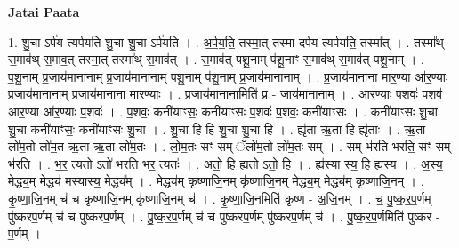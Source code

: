 \documentclass[17pt]{extarticle}
\begin{document}
\textbf{Jatai Paata} \newline

1. शु॒चा ऽर्प॑य त्यर्पयति शु॒चा शु॒चा ऽर्प॑यति । . अ॒र्प॒य॒ति॒ तस्मा॒त् तस्मा॑ दर्पय त्यर्पयति॒ तस्मा᳚त् । . तस्मा᳚थ् स॒माव॑थ् स॒माव॒त् तस्मा॒त् तस्मा᳚थ् स॒माव॑त् । . स॒माव॑त् पशू॒नाम् प॑शू॒नाꣳ स॒माव॑थ् स॒माव॑त् पशू॒नाम् । . प॒शू॒नाम् प्र॒जाय॑मानानाम् प्र॒जाय॑मानानाम् पशू॒नाम् प॑शू॒नाम् प्र॒जाय॑मानानाम् । . प्र॒जाय॑मानाना मार॒ण्या आ॑र॒ण्याः प्र॒जाय॑मानानाम् प्र॒जाय॑मानाना मार॒ण्याः । . प्र॒जाय॑मानाना॒मिति॑ प्र - जाय॑मानानाम् । . आ॒र॒ण्याः प॒शवः॑ प॒शव॑ आर॒ण्या आ॑र॒ण्याः प॒शवः॑ । . प॒शवः॒ कनी॑याꣳसः॒ कनी॑याꣳसः प॒शवः॑ प॒शवः॒ कनी॑याꣳसः । . कनी॑याꣳसः शु॒चा शु॒चा कनी॑याꣳसः॒ कनी॑याꣳसः शु॒चा । . शु॒चा हि हि शु॒चा शु॒चा हि । . ह्यृ॑ता ऋ॒ता हि ह्यृ॑ताः । . ऋ॒ता लो॑म॒तो लो॑म॒त ऋ॒ता ऋ॒ता लो॑म॒तः । . लो॒म॒तः सꣳ सम् ॅलो॑म॒तो लो॑म॒तः सम् । . सम् भ॑रति भरति॒ सꣳ सम् भ॑रति । . भ॒र॒ त्यतो ऽतो॑ भरति भर॒ त्यतः॑ । . अतो॒ हि ह्यतो ऽतो॒ हि । . ह्य॑स्या स्य॒ हि ह्य॑स्य । . अ॒स्य॒ मेद्ध्य॒म् मेद्ध्य॑ मस्यास्य॒ मेद्ध्य᳚म् । . मेद्ध्य॑म् कृष्णाजि॒नम् कृ॑ष्णाजि॒नम् मेद्ध्य॒म् मेद्ध्य॑म् कृष्णाजि॒नम् । . कृ॒ष्णा॒जि॒नम् च॑ च कृष्णाजि॒नम् कृ॑ष्णाजि॒नम् च॑ । . कृ॒ष्णा॒जि॒नमिति॑ कृष्ण - अ॒जि॒नम् । . च॒ पु॒ष्क॒र॒प॒र्णम् पु॑ष्करप॒र्णम् च॑ च पुष्करप॒र्णम् । . पु॒ष्क॒र॒प॒र्णम् च॑ च पुष्करप॒र्णम् पु॑ष्करप॒र्णम् च॑ । . पु॒ष्क॒र॒प॒र्णमिति॑ पुष्कर - प॒र्णम् । \newline
\end{document}
